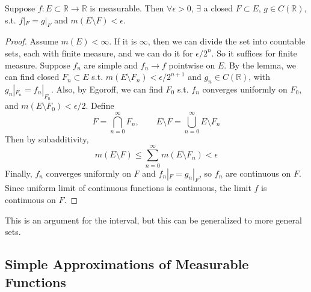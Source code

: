   \begin{theorem}[Luzin]
    Suppose $f: E \subset \mathbb{R} \to \mathbb{R}$ is measurable. Then $\forall \epsilon > 0$, $\exists$ a closed $F \subset E$, $g \in C(\mathbb{R})$, s.t. $f|_F = g |_F$ and $m(E \setminus F) < \epsilon$. 
  \end{theorem}
  \begin{proof}
    Assume $m(E) < \infty$. If it is $\infty$, then we can divide the set into countable sets, each with finite measure, and we can do it for $\epsilon/2^{n}$. So it suffices for finite measure. Suppose $f_n$ are simple and $f_n \to f$ pointwise on $E$. By the lemma, we can find closed $F_n \subset E$ s.t. $m(E \setminus F_n) < \epsilon / 2^{n+1}$ and $g_n \in C(\mathbb{R})$, with $g_n |_{F_n} = f_n |_{F_n}$. Also, by Egoroff, we can find $F_0$ s.t. $f_n$ converges uniformly on $F_0$, and $m(E \setminus F_0) < \epsilon / 2$. Define 
    \begin{equation}
      F = \bigcap_{n=0}^\infty F_n, \qquad E \setminus F = \bigcup_{n=0}^\infty E \setminus F_n
    \end{equation}
    Then by subadditivity,
    \begin{equation}
      m(E \setminus F) \leq \sum_{n=0}^\infty m(E \setminus F_n) < \epsilon
    \end{equation}
    Finally, $f_n$ converges uniformly on $F$ and $f_n |_F = g_n |_F$, so $f_n$ are continuous on $F$. Since uniform limit of continuous functions is continuous, the limit $f$ is continuous on $F$. 
  \end{proof}

  This is an argument for the interval, but this can be generalized to more general sets. 

\subsection{Simple Approximations of Measurable Functions}

